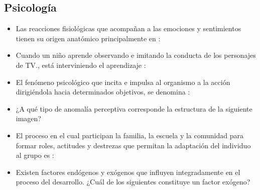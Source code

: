 \documentclass[10pt, twocolumn, landscape, a4paper]{article}
\begin{document}
\subsection*{Psicología}

\begin{itemize}
\item{Las reacciones fisiológicas que acompañan a las emociones y sentimientos tienen su origen anatómico principalmente en :
\begin{tasks}
\end{tasks}
}
\item{Cuando un niño aprende observando e imitando la conducta de los personajes de TV., está interviniendo el aprendizaje :
\begin{tasks}
\end{tasks}
}
\item{El fenómeno psicológico que incita e impulsa al organismo a la acción dirigiéndola hacia determinados objetivos, se denomina : 
\begin{tasks}
\end{tasks}
}
\item{¿A qué tipo de anomalía perceptiva corresponde la estructura de la siguiente imagen?
\begin{tasks}
\end{tasks}
}
\item{El proceso en el cual participan la familia, la escuela y la comunidad para formar roles, actitudes y destrezas que permitan la adaptación del individuo al grupo es :
\begin{tasks}
\end{tasks}
}
\item{Existen factores endógenos y exógenos que influyen integradamente en el proceso del desarrollo. ¿Cuál de los siguientes constituye un factor exógeno?
\begin{tasks}
\end{tasks}
}
\end{itemize}
\end{document}
